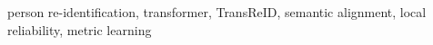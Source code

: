 person re-identification, transformer, TransReID, semantic alignment, local reliability, metric learning
